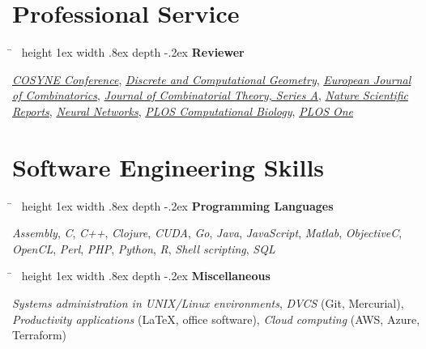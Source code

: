 \documentclass[10pt]{article} %
\newlength{\smallertextwidth}
\newcommand{\sqbullet}{~\vrule height 1ex width .8ex depth -.2ex} %
\newcommand{\skillgroup}[2]{
\begin{tabbing}
\hspace{5mm} \= \kill
\sqbullet \>\+ \textbf{#1}\\
\begin{minipage}{\smallertextwidth}
\vspace{2mm}
#2
\end{minipage}
\end{tabbing}
}
\begin{document}

\section{Professional Service}

\skillgroup{Reviewer}
{
\textit{\href{http://www.cosyne.org}{COSYNE Conference}},
\textit{\href{https://link.springer.com/journal/454}{Discrete and Computational Geometry}},
\textit{\href{https://www.journals.elsevier.com/european-journal-of-combinatorics}{European Journal of Combinatorics}},
\textit{\href{https://www.journals.elsevier.com/journal-of-combinatorial-theory-series-a}{Journal of Combinatorial Theory, Series A}},
\textit{\href{https://www.nature.com/srep/}{Nature Scientific Reports}},
\textit{\href{https://www.journals.elsevier.com/neural-networks}{Neural Networks}},
\textit{\href{https://journals.plos.org/ploscompbiol/}{PLOS Computational Biology}},
\textit{\href{https://journals.plos.org/plosone/}{PLOS One}}
}


\section{Software Engineering Skills}

\skillgroup{Programming Languages}
{
\textit{Assembly}, \textit{C}, \textit{C++},
\textit{Clojure},
\textit{CUDA},
\textit{Go},
\textit{Java},
\textit{JavaScript},
\textit{Matlab},
\textit{ObjectiveC},
\textit{OpenCL},
\textit{Perl},
\textit{PHP},
\textit{Python},
\textit{R},
\textit{Shell scripting},
\textit{SQL}
}


\skillgroup{Miscellaneous}
{
\textit{Systems administration in UNIX/Linux environments},
\textit{DVCS} (Git, Mercurial), 
\textit{Productivity applications} (LaTeX, office software),
\textit{Cloud computing} (AWS, Azure, Terraform)
}

\end{document}
